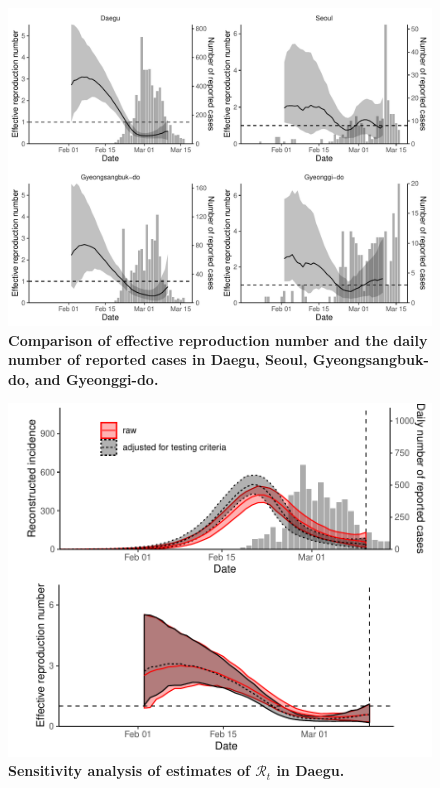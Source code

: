\begin{figure}[!ht]
\includegraphics[width=\textwidth]{figure_R_t_all.pdf}
\caption{
\textbf{Comparison of effective reproduction number and the daily number of reported cases in Daegu, Seoul, Gyeongsangbuk-do, and Gyeonggi-do.}
}
\end{figure}

\pagebreak

\begin{figure}[!ht]
\includegraphics[width=\textwidth]{figure_R_t_daegu.pdf}
\caption{
\textbf{Sensitivity analysis of estimates of $\mathcal R_t$ in Daegu.}
}
\end{figure}

